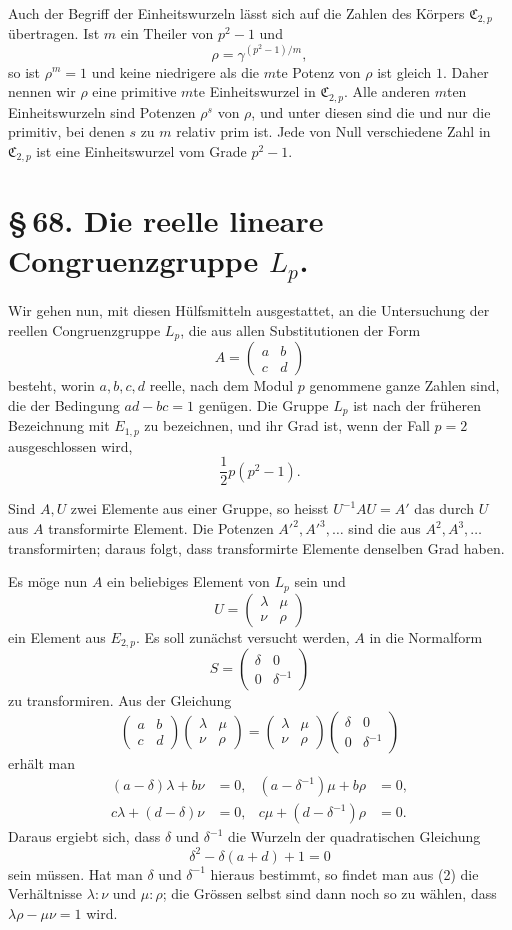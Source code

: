 \documentclass[11pt]{article}
\providecommand{\mat}[4]{\begin{pmatrix}#1&#2\\#3&#4\end{pmatrix}}
\providecommand{\mat}[4]{\begin{pmatrix}#1&#2\\#3&#4\end{pmatrix}}
\providecommand{\Cfield}{\mathfrak C}
\begin{document}
Auch der Begriff der Einheitswurzeln lässt sich auf die Zahlen des Körpers $\Cfield_{2,p}$ übertragen. Ist $m$ ein Theiler von $p^2-1$ und
\[
 \rho=\gamma^{(p^2-1)/m},
\]
so ist $\rho^m=1$ und keine niedrigere als die $m$te Potenz von $\rho$ ist gleich $1$. Daher nennen wir $\rho$ eine primitive $m$te Einheitswurzel in $\Cfield_{2,p}$. Alle anderen $m$ten Einheitswurzeln sind Potenzen $\rho^s$ von $\rho$, und unter diesen sind die und nur die primitiv, bei denen $s$ zu $m$ relativ prim ist. Jede von Null verschiedene Zahl in $\Cfield_{2,p}$ ist eine Einheitswurzel vom Grade $p^2-1$.

\section*{\S\,68. Die reelle lineare Congruenzgruppe $L_p$.}

Wir gehen nun, mit diesen Hülfsmitteln ausgestattet, an die Untersuchung der reellen Congruenzgruppe $L_p$, die aus allen Substitutionen der Form
\[
 A=\mat{a}{b}{c}{d}
\]
besteht, worin $a,b,c,d$ reelle, nach dem Modul $p$ genommene ganze Zahlen sind, die der Bedingung $ad-bc=1$ genügen. Die Gruppe $L_p$ ist nach der früheren Bezeichnung mit $E_{1,p}$ zu bezeichnen, und ihr Grad ist, wenn der Fall $p=2$ ausgeschlossen wird,
\[
 \frac12 p(p^2-1).
\]

Sind $A,U$ zwei Elemente aus einer Gruppe, so heisst $U^{-1}AU=A'$ das durch $U$ aus $A$ transformirte Element. Die Potenzen $A'^2,A'^3,\ldots$ sind die aus $A^2,A^3,\ldots$ transformirten; daraus folgt, dass transformirte Elemente denselben Grad haben.

Es möge nun $A$ ein beliebiges Element von $L_p$ sein und
\[
 U=\mat{\lambda}{\mu}{\nu}{\rho}
\]
ein Element aus $E_{2,p}$. Es soll zunächst versucht werden, $A$ in die Normalform
\begin{equation}
 S=\mat{\delta}{0}{0}{\delta^{-1}}
 \tag{1}
\end{equation}
zu transformiren. Aus der Gleichung
\[
 \mat{a}{b}{c}{d}\mat{\lambda}{\mu}{\nu}{\rho}
 =\mat{\lambda}{\mu}{\nu}{\rho}\mat{\delta}{0}{0}{\delta^{-1}}
\]
erhält man
\begin{equation}
\begin{aligned}
 (a-\delta)\lambda+b\nu&=0,&
 (a-\delta^{-1})\mu+b\rho&=0,\\
 c\lambda+(d-\delta)\nu&=0,&
 c\mu+(d-\delta^{-1})\rho&=0.
\end{aligned}
\tag{2}
\end{equation}
Daraus ergiebt sich, dass $\delta$ und $\delta^{-1}$ die Wurzeln der quadratischen Gleichung
\begin{equation}
 \delta^2-\delta(a+d)+1=0
 \tag{3}
\end{equation}
sein müssen. Hat man $\delta$ und $\delta^{-1}$ hieraus bestimmt, so findet man aus (2) die Verhältnisse $\lambda:\nu$ und $\mu:\rho$; die Grössen selbst sind dann noch so zu wählen, dass $\lambda\rho-\mu\nu=1$ wird.
\end{document}
